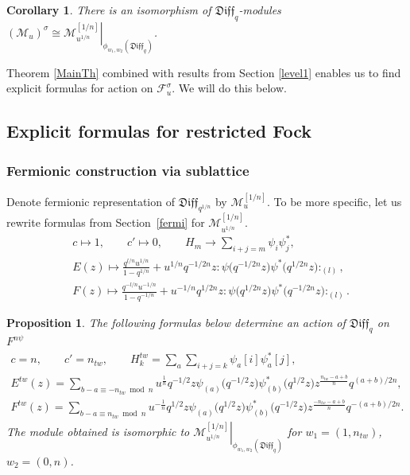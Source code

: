 \documentclass[11pt]{article}
\numberwithin{equation}{section}
\newtheorem{Proposition}[Theorem]{Proposition}
\newtheorem{Corollary}[Theorem]{Corollary}
\theoremstyle{definition}
\newcommand{\qd}[1]{ \mathfrak{Diff}_{q^{#1}} }
\newcommand{\qD}{\mathfrak{Diff}_q}
\newcommand{\psia}{\psi_{({a})}}
\newcommand{\psib}{\psi^*_{( b )}}
\begin{document}
\begin{Corollary}There is an isomorphism of $\qD$-modules $\left. ( \mathcal{M}_{u} )^{ \sigma } \cong \mathcal{M}^{[1/n]}_{u^{1/n}} \right|_{\phi_{w_1,w_2} (\qD ) }$.
\end{Corollary}

Theorem \ref{MainTh} combined with results from Section \ref{level1} enables us to find explicit formulas for action on $\mathcal{F}_{u}^{ \sigma }$. We will do this below.

\subsection{Explicit formulas for restricted Fock}
\subsubsection{Fermionic construction via sublattice}
Denote fermionic representation of $\qd{1/n}$ by $\mathcal{M}^{[1/n]}_u$. To be more specific, let us rewrite formulas from Section~\ref{fermi} for $\mathcal{M}^{[1/n]}_{u^{1/n}}$.
\begin{align}
&c \mapsto 1, \qquad c' \mapsto 0, \qquad H_m \rightarrow \sum_{i+j=m} \psi_i \psi_j^*, \nonumber\\
&E(z) \mapsto \frac{q^{l/n} u^{1/n} }{1-q^{1/n}} + u^{1/n} q^{ - 1/2n }z : \! \psi\big( q^{-1/2n} z\big) \psi^* \big( q^{1/2n} z\big) \! :_{(l)} ,
\label{ferm:En} \\
&F(z) \mapsto \frac{q^{-l/n} u^{-1/n} }{1-q^{-1/n}} + u^{-1/n} q^{1/2n} z : \! \psi\big( q^{1/2n} z\big) \psi^* \big(q^{-1/2n} z\big)\!:_{(l)}.
\label{ferm:Fn}
\end{align}
\begin{Proposition} \label{TheFermionicProp}
The following formulas below determine an action of $\qD$ on $F^{n\psi}$
\begin{gather}
c=n, \qquad c' = n_{tw}, \qquad
H^{tw}_k = \sum_{a} \sum_{i+j=k} \psi_a [i] \psi^*_a [j] , \label{eq1: TheFermionicProp} \\
E^{tw}(z) = \sum_{b-a \equiv -n_{tw} \bmod n} u^{\frac{1}{n}} q^{-1/2} z \psia \big( q^{-1/2} z\big) \psib \big(q^{1/2} z\big) z^{\frac{n_{tw}-a+b}{n}} q^{(a+b)/2n}, \label{prop:EtwFermi} \\
F^{tw}(z) = \sum_{b-a \equiv n_{tw} \bmod n} u^{-\frac{1}{n}} q^{1/2} z \psia \big( q^{1/2} z\big) \psib \big(q^{-1/2} z\big) z^{\frac{-n_{tw}-a+b}{n}} q^{-(a+b)/2n}. \label{prop:FtwFermi}
\end{gather}
The module obtained is isomorphic to $\left. \mathcal{M}^{[1/n]}_{u^{1/n}} \right|_{\phi_{w_1, w_2}(\qD)}$ for $w_1=(1, n_{tw})$, $w_2=(0,n)$.
\end{Proposition}
\end{document}

